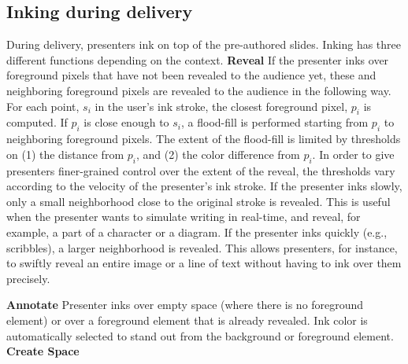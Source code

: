\subsection{Inking during delivery}
During delivery, presenters ink on top of the pre-authored slides. Inking has three different functions depending on the context. 
\textbf{Reveal}
If the presenter inks over  foreground pixels that have not been revealed to the audience yet, these and neighboring foreground pixels are revealed to the audience in the following way. For each point, $s_i$ in the user's ink stroke, the closest foreground pixel, $p_i$ is computed. If $p_i$ is close enough to $s_i$, a flood-fill is performed starting from $p_i$ to neighboring foreground pixels. The extent of the flood-fill is limited by thresholds on (1) the distance from $p_i$, and (2) the color difference from $p_i$. In order to give presenters finer-grained control over the extent of the reveal, the thresholds vary according to the velocity of the presenter's ink stroke. If the presenter inks slowly, only a small neighborhood close to the original stroke is revealed. This is useful when the presenter wants to simulate writing in real-time, and reveal, for example, a part of a character or a diagram. If the presenter inks quickly (e.g., scribbles), a larger neighborhood is revealed. This allows presenters, for instance, to swiftly reveal an entire image or a line of text without having to ink over them precisely.  

\textbf{Annotate}
Presenter inks over empty space (where there is no foreground element) or over a foreground element that is already revealed. Ink color is automatically selected to stand out from the background or foreground element.
\textbf{Create Space}